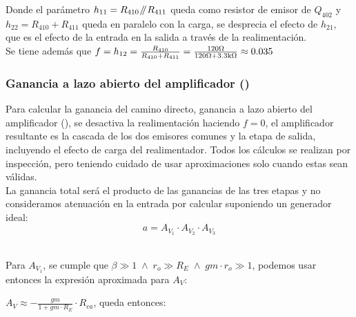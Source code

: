 \clearpage

\label{calculation_of_f}

\begin{sloppypar}
Donde el parámetro $h_{11} = R_{410} \mathbin{\!/\mkern-5mu/\!} R_{411} $ queda como resistor de emisor de $Q_{402}$ y $h_{22} = R_{410} + R_{411} $ queda en paralelo con la carga, se desprecia el efecto de $h_{21}$, que es el efecto de la entrada en la salida a través de la realimentación.\\

Se tiene además que $f = h_{12} = \frac{R_{410}}{R_{410} + R_{411}} = \frac{120 \si[per-mode=symbol]{\ohm}}{120 \si[per-mode=symbol]{\ohm} + 3.3 \si[per-mode=symbol]{\kilo\ohm}} \approx 0.035  $
\end{sloppypar}

\subsubsection{Ganancia a lazo abierto del amplificador ()}
\label{stages_gain}

Para calcular la ganancia del camino directo, ganancia a lazo abierto del amplificador (\textbf{}), se desactiva la realimentación haciendo $f = 0$, el amplificador resultante es la cascada de los dos emisores comunes y la etapa de salida, incluyendo el efecto de carga del realimentador. Todos los cálculos se realizan por inspección, pero teniendo cuidado de usar aproximaciones solo cuando estas sean válidas.\\

La ganancia total será el producto de las ganancias de las tres etapas y no consideramos atenuación en la entrada por calcular suponiendo un generador ideal:\\

\begin{equation}
a = A_{V_{1}} \cdot A_{V_{2}} \cdot A_{V_{3}}
\end{equation}\\





\begin{sloppypar}
Para $A_{V_{1}}$, se cumple que $\beta \gg 1 \; \land \; r_{o} \gg R_{E} \; \land \; gm \cdot r_{o} \gg 1$, podemos usar entonces la expresión aproximada para $A_{V}$: 

$A_{V} \approx -\frac{gm}{1 + gm \cdot R_{E}} \cdot R_{ca}$,  queda entonces:
\end{sloppypar}


